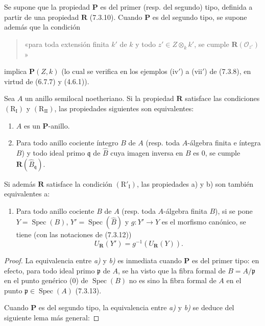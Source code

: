 \begin{proposition}[7.3.16]
\label{IV.2.s7.3.16-fr}
Se supone que la propiedad $\boldsymbol P$ es del primer \textup{(resp.} del
segundo) tipo, definida a partir de una propiedad $\boldsymbol R$
\textup{(7.3.10)}. Cuando $\boldsymbol P$ es del segundo tipo, se supone además
que la condición
\begin{quote}
«para toda extensión \textup{finita} $k'$ de $k$ y todo
$z'\in Z\otimes_k k'$, se cumple
$\boldsymbol R(\mathscr O_{z'})$»
\end{quote}
implica $\boldsymbol P(Z,k)$ \textup{(lo cual se verifica en los ejemplos
(iv$'$) a (vii$'$) de (7.3.8), en virtud de (6.7.7) y (4.6.1))}.

Sea $A$ un anillo semilocal noetheriano. Si la propiedad
$\boldsymbol R$ satisface las condiciones $(\mathrm R_{\mathrm I})$
y $(\mathrm R_{\mathrm{II}})$, las propiedades siguientes son
equivalentes:
\begin{enumerate}
\item[\emph{a)}] $A$ es un $\boldsymbol P$-anillo.
\item[\emph{b)}] Para todo anillo cociente íntegro $B$ de $A$
\textup{(resp.} toda $A$-álgebra finita e íntegra $B$) y todo ideal primo
$\mathfrak q$ de $\widehat B$ cuya imagen inversa en $B$ es 0, se
cumple $\boldsymbol R(\widehat B_{\mathfrak q})$.
\end{enumerate}

Si además $\boldsymbol R$ satisface la condición
$(\mathrm R'_{\mathrm I})$, las propiedades \textup{a)} y \textup{b)} son también
equivalentes a:
\begin{enumerate}
\item[\emph{c)}] Para todo anillo cociente $B$ de $A$ \textup{(resp.} toda
$A$-álgebra finita $B$), si se pone
$Y=\operatorname{Spec}(B)$,
$Y'=\operatorname{Spec}(\widehat B)$ y $g:Y'\to Y$ es el morfismo
canónico, se tiene (con las notaciones de \textup{(7.3.12)})
\begin{equation}
U_{\mathbf{R}}(Y')=g^{-1}(U_{\mathbf{R}}(Y)).
\tag{7.3.16.1}
\label{IV.2.eq.7.3.16.1-fr}
\end{equation}
\end{enumerate}
\end{proposition}

\begin{proof}
La equivalencia entre \emph{a)} y \emph{b)} es inmediata cuando $\boldsymbol P$ es
del primer tipo: en efecto, para todo ideal primo $\mathfrak p$ de
$A$, se ha visto que la fibra formal de $B=A/\mathfrak p$ en el punto
genérico (0) de $\operatorname{Spec}(B)$ no es sino la fibra formal de
$A$ en el punto $\mathfrak p\in\operatorname{Spec}(A)$ (7.3.13).

Cuando $\boldsymbol P$ es del segundo tipo, la equivalencia entre \emph{a)}
y \emph{b)} se deduce del siguiente lema más general:
\end{proof}

